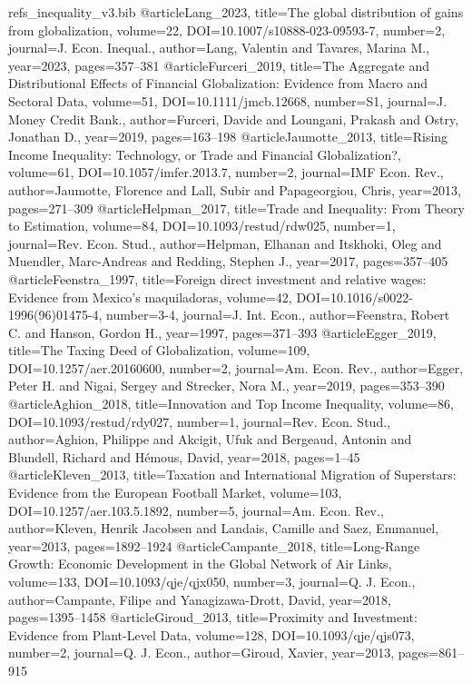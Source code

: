 \begin{filecontents*}[overwrite]{refs_inequality_v3.bib}
@article{Lang_2023, title={The global distribution of gains from globalization}, volume={22}, DOI={10.1007/s10888-023-09593-7}, number={2}, journal={J. Econ. Inequal.}, author={Lang, Valentin and Tavares, Marina M.}, year={2023}, pages={357--381} }
@article{Furceri_2019, title={The Aggregate and Distributional Effects of Financial Globalization: Evidence from Macro and Sectoral Data}, volume={51}, DOI={10.1111/jmcb.12668}, number={S1}, journal={J. Money Credit Bank.}, author={Furceri, Davide and Loungani, Prakash and Ostry, Jonathan D.}, year={2019}, pages={163--198} }
@article{Jaumotte_2013, title={Rising Income Inequality: Technology, or Trade and Financial Globalization?}, volume={61}, DOI={10.1057/imfer.2013.7}, number={2}, journal={IMF Econ. Rev.}, author={Jaumotte, Florence and Lall, Subir and Papageorgiou, Chris}, year={2013}, pages={271--309} }
@article{Helpman_2017, title={Trade and Inequality: From Theory to Estimation}, volume={84}, DOI={10.1093/restud/rdw025}, number={1}, journal={Rev. Econ. Stud.}, author={Helpman, Elhanan and Itskhoki, Oleg and Muendler, Marc-Andreas and Redding, Stephen J.}, year={2017}, pages={357--405} }
@article{Feenstra_1997, title={Foreign direct investment and relative wages: Evidence from {Mexico}'s maquiladoras}, volume={42}, DOI={10.1016/s0022-1996(96)01475-4}, number={3-4}, journal={J. Int. Econ.}, author={Feenstra, Robert C. and Hanson, Gordon H.}, year={1997}, pages={371--393} }
@article{Egger_2019, title={The Taxing Deed of Globalization}, volume={109}, DOI={10.1257/aer.20160600}, number={2}, journal={Am. Econ. Rev.}, author={Egger, Peter H. and Nigai, Sergey and Strecker, Nora M.}, year={2019}, pages={353--390} }
@article{Aghion_2018, title={Innovation and Top Income Inequality}, volume={86}, DOI={10.1093/restud/rdy027}, number={1}, journal={Rev. Econ. Stud.}, author={Aghion, Philippe and Akcigit, Ufuk and Bergeaud, Antonin and Blundell, Richard and H\'emous, David}, year={2018}, pages={1--45} }
@article{Kleven_2013, title={Taxation and International Migration of Superstars: Evidence from the {European} Football Market}, volume={103}, DOI={10.1257/aer.103.5.1892}, number={5}, journal={Am. Econ. Rev.}, author={Kleven, Henrik Jacobsen and Landais, Camille and Saez, Emmanuel}, year={2013}, pages={1892--1924} }
@article{Campante_2018, title={Long-Range Growth: Economic Development in the Global Network of Air Links}, volume={133}, DOI={10.1093/qje/qjx050}, number={3}, journal={Q. J. Econ.}, author={Campante, Filipe and Yanagizawa-Drott, David}, year={2018}, pages={1395--1458} }
@article{Giroud_2013, title={Proximity and Investment: Evidence from Plant-Level Data}, volume={128}, DOI={10.1093/qje/qjs073}, number={2}, journal={Q. J. Econ.}, author={Giroud, Xavier}, year={2013}, pages={861--915} }

\end{filecontents*}
